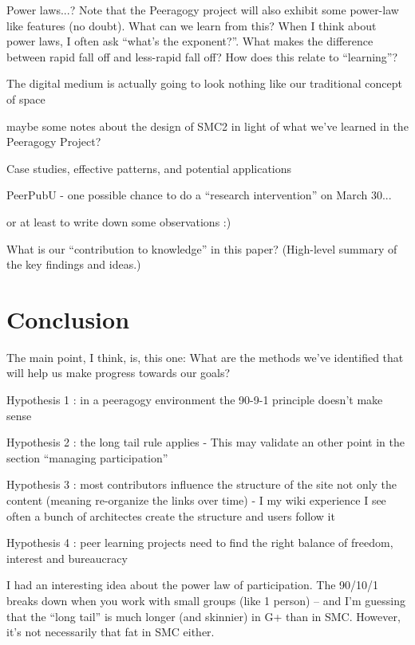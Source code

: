 \documentclass[twoside]{article}
\begin{document}
\begin{multicols}{2}
        Power laws...? Note that the Peeragogy project will also exhibit some power-law like features (no doubt). What can we learn from this? When I think about power laws, I often ask ``what's the exponent?''. What makes the difference between rapid fall off and less-rapid fall off? How does this relate to ``learning''?

    The digital medium is actually going to look nothing like our traditional concept of space

        maybe some notes about the design of SMC2 in light of what we've learned in the Peeragogy Project? 

    Case studies, effective patterns, and potential applications

        PeerPubU - one possible chance to do a ``research intervention'' on March 30...

        or at least to write down some observations :)

        What is our ``contribution to knowledge'' in this paper? (High-level summary of the key findings and ideas.)\cite{paragogy}
\cite{Origins}
\cite{Tales}
\cite{Peeragogy-2}
\cite{College}
\cite{Bridges}
\cite{peer}
\cite{Gluing}
\cite{GroupInformatics}
\cite{Why}
\cite{PeeragogyinAction}

%
%
%
%

\section{Conclusion}

    The main point, I think, is, this one: What are the methods we've identified that will help us make progress towards our goals?

                Hypothesis 1 : in a peeragogy environment the 90-9-1 principle doesn't make sense

                Hypothesis 2 : the long tail rule applies - This may validate an other point in the section ``managing participation''

                Hypothesis 3 : most contributors influence the structure of the site not only the content (meaning re-organize the links over time) - I my wiki experience I see often a bunch of architectes create the structure and users follow it

                Hypothesis 4 : peer learning projects need to find the right balance of freedom, interest and bureaucracy

        I had an interesting idea about the power law of participation. The 90/10/1 breaks down when you work with small groups (like 1 person) -- and I'm guessing that the ``long tail'' is much longer (and skinnier) in G+ than in SMC. However, it's not necessarily that fat in SMC either.


\end{multicols}
\end{document}
